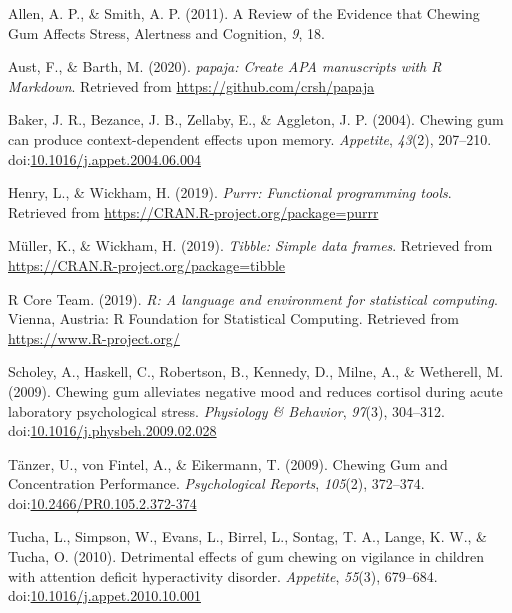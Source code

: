\documentclass[man]{apa6}
\begin{document}
\hypertarget{refs}{}
\leavevmode\hypertarget{ref-allenReviewEvidenceThat2011}{}%
Allen, A. P., \& Smith, A. P. (2011). A Review of the Evidence that Chewing Gum Affects Stress, Alertness and Cognition, \emph{9}, 18.

\leavevmode\hypertarget{ref-R-papaja}{}%
Aust, F., \& Barth, M. (2020). \emph{papaja: Create APA manuscripts with R Markdown}. Retrieved from \url{https://github.com/crsh/papaja}

\leavevmode\hypertarget{ref-bakerChewingGumCan2004}{}%
Baker, J. R., Bezance, J. B., Zellaby, E., \& Aggleton, J. P. (2004). Chewing gum can produce context-dependent effects upon memory. \emph{Appetite}, \emph{43}(2), 207--210. doi:\href{https://doi.org/10.1016/j.appet.2004.06.004}{10.1016/j.appet.2004.06.004}

\leavevmode\hypertarget{ref-R-purrr}{}%
Henry, L., \& Wickham, H. (2019). \emph{Purrr: Functional programming tools}. Retrieved from \url{https://CRAN.R-project.org/package=purrr}

\leavevmode\hypertarget{ref-R-tibble}{}%
Müller, K., \& Wickham, H. (2019). \emph{Tibble: Simple data frames}. Retrieved from \url{https://CRAN.R-project.org/package=tibble}

\leavevmode\hypertarget{ref-R-base}{}%
R Core Team. (2019). \emph{R: A language and environment for statistical computing}. Vienna, Austria: R Foundation for Statistical Computing. Retrieved from \url{https://www.R-project.org/}

\leavevmode\hypertarget{ref-scholeyChewingGumAlleviates2009}{}%
Scholey, A., Haskell, C., Robertson, B., Kennedy, D., Milne, A., \& Wetherell, M. (2009). Chewing gum alleviates negative mood and reduces cortisol during acute laboratory psychological stress. \emph{Physiology \& Behavior}, \emph{97}(3), 304--312. doi:\href{https://doi.org/10.1016/j.physbeh.2009.02.028}{10.1016/j.physbeh.2009.02.028}

\leavevmode\hypertarget{ref-tanzerChewingGumConcentration2009}{}%
Tänzer, U., von Fintel, A., \& Eikermann, T. (2009). Chewing Gum and Concentration Performance. \emph{Psychological Reports}, \emph{105}(2), 372--374. doi:\href{https://doi.org/10.2466/PR0.105.2.372-374}{10.2466/PR0.105.2.372-374}

\leavevmode\hypertarget{ref-tuchaDetrimentalEffectsGum2010}{}%
Tucha, L., Simpson, W., Evans, L., Birrel, L., Sontag, T. A., Lange, K. W., \& Tucha, O. (2010). Detrimental effects of gum chewing on vigilance in children with attention deficit hyperactivity disorder. \emph{Appetite}, \emph{55}(3), 679--684. doi:\href{https://doi.org/10.1016/j.appet.2010.10.001}{10.1016/j.appet.2010.10.001}
\end{document}
